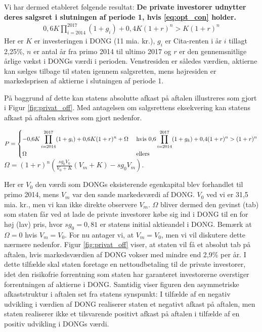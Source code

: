\documentclass{article}
\begin{document}





Vi har dermed etableret følgende resultat: \textbf{De private investorer udnytter deres salgsret i slutningen af periode 1, hvis \eqref{eq:opt_con} holder. } 
\begin{align}
0{,}6K\prod_{i=2014}^{2017}(1+g_i)+0{,}4K(1+r)^n>K(1+r)^n \label{eq:opt_con}
\end{align}
Her er $K$ er investeringen i DONG (11 mia. kr.), $g_i$ er Cita-renten i år $i$ tillagt 2,25\%, $n$ er antal år fra primo 2014 til ultimo 2017 og $r$ er den gennemsnitlige årlige vækst i DONGs værdi i perioden. Venstresiden er således værdien, aktierne kan sælges tilbage til staten igennem salgsretten, mens højresiden er markedsprisen af aktierne i slutningen af periode 1.

På baggrund af dette kan statens absolutte afkast på aftalen illustreres som gjort i Figur \ref{fig:privat_off}. Med antagelsen om salgsrettens eksekvering kan statens afkast på aftalen skrives som gjort nedenfor. %

$P=\begin{dcases} 
-0{,}6K \prod_{i=2014}^{2017} (1+g_i)+0{,}6K(1+r)^n +\Omega&\text{     hvis    } 0{,}6\prod_{i=2014}^{2017}(1+g_k)+0{,}4(1+r)^n>(1+r)^n \\ 
\Omega  &\text{   ellers } 
\end {dcases} $\\
 $\Omega=(1+r)^n\left( \frac{sg_0 V_0}{V_0+K} \left( V_m+K \right)-sg_0 V_m \right)$.

Her er $V_0$ den værdi som DONGs eksisterende egenkapital blev forhandlet til primo 2014, mens $V_m$ var den sande markedsværdi af DONG. $V_0$ ved vi er 31,5 mia. kr., men vi kan ikke direkte observere $V_m$. $\Omega$ bliver dermed den gevinst (tab) som staten får ved at lade de private investorer købe sig ind i DONG til en for høj (lav) pris, hvor $sg_0=0{,}81$ er statens initial aktieandel i DONG. Bemærk at $\Omega=0$ hvis $V_m=V_0$. For nu antager vi, at $V_m=V_0$, men vi vil diskutere dette nærmere nedenfor. Figur \ref{fig:privat_off} viser, at staten vil få et absolut tab på aftalen, hvis markedsværdien af DONG vokser med mindre end 2{,}9\% per år. I dette tilfælde skal staten foretage en nettoudbetaling til de private investorer, idet den risikofrie forrentning som staten har garanteret investorerne overstiger forrentningen af aktierne i DONG. Samtidig viser figuren den asymmetriske afkaststruktur i aftalen set fra statens synspunkt: I tilfælde af en negativ udvikling i værdien af DONG realiserer staten et negativt afkast på aftalen, men staten realiserer ikke et tilsvarende positivt afkast på aftalen i tilfælde af en positiv udvikling i DONGs værdi. 
\end{document}
